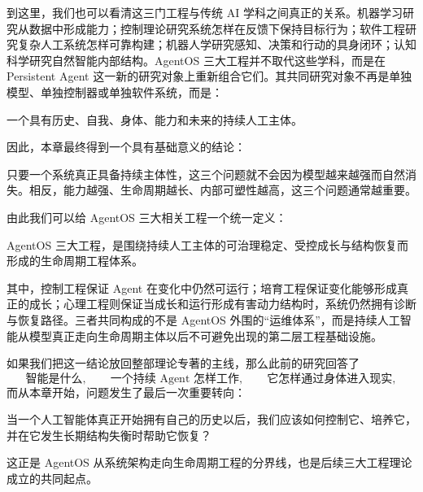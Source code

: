到这里，我们也可以看清这三门工程与传统 AI 学科之间真正的关系。机器学习研究从数据中形成能力；控制理论研究系统怎样在反馈下保持目标行为；软件工程研究复杂人工系统怎样可靠构建；机器人学研究感知、决策和行动的具身闭环；认知科学研究自然智能内部结构。AgentOS 三大工程并不取代这些学科，而是在 Persistent Agent 这一新的研究对象上重新组合它们。其共同研究对象不再是单独模型、单独控制器或单独软件系统，而是：
\begin{statementbox}
一个具有历史、自我、身体、能力和未来的持续人工主体。
\end{statementbox}

因此，本章最终得到一个具有基础意义的结论：
\begin{statementbox}
\centering
{}
\end{statementbox}
只要一个系统真正具备持续主体性，这三个问题就不会因为模型越来越强而自然消失。相反，能力越强、生命周期越长、内部可塑性越高，这三个问题通常越重要。

由此我们可以给 AgentOS 三大相关工程一个统一定义：
\begin{definition*}
AgentOS 三大工程，是围绕持续人工主体的可治理稳定、受控成长与结构恢复而形成的生命周期工程体系。
\end{definition*}
其中，控制工程保证 Agent 在变化中仍然可运行；培育工程保证变化能够形成真正的成长；心理工程则保证当成长和运行形成有害动力结构时，系统仍然拥有诊断与恢复路径。三者共同构成的不是 AgentOS 外围的“运维体系”，而是持续人工智能从模型真正走向生命周期主体以后不可避免出现的第二层工程基础设施。

如果我们把这一结论放回整部理论专著的主线，那么此前的研究回答了
\[
\text{智能是什么},
\qquad
\text{一个持续 Agent 怎样工作},
\qquad
\text{它怎样通过身体进入现实},
\]
而从本章开始，问题发生了最后一次重要转向：
\begin{statementbox}
当一个人工智能体真正开始拥有自己的历史以后，我们应该如何控制它、培养它，并在它发生长期结构失衡时帮助它恢复？
\end{statementbox}
这正是 AgentOS 从系统架构走向生命周期工程的分界线，也是后续三大工程理论成立的共同起点。
